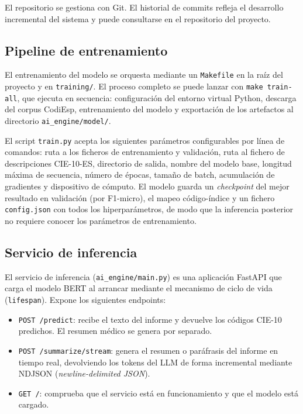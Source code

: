 El repositorio se gestiona con Git. El historial de commits refleja el desarrollo incremental del sistema y puede consultarse en el repositorio del proyecto.

\subsection{Pipeline de entrenamiento}

El entrenamiento del modelo se orquesta mediante un \texttt{Makefile} en la raíz del proyecto y en \texttt{training/}. El proceso completo se puede lanzar con \texttt{make train-all}, que ejecuta en secuencia: configuración del entorno virtual Python, descarga del corpus CodiEsp, entrenamiento del modelo y exportación de los artefactos al directorio \texttt{ai\_engine/model/}.

El script \texttt{train.py} acepta los siguientes parámetros configurables por línea de comandos: ruta a los ficheros de entrenamiento y validación, ruta al fichero de descripciones CIE-10-ES, directorio de salida, nombre del modelo base, longitud máxima de secuencia, número de épocas, tamaño de batch, acumulación de gradientes y dispositivo de cómputo. El modelo guarda un \emph{checkpoint} del mejor resultado en validación (por F1-micro), el mapeo código-índice y un fichero \texttt{config.json} con todos los hiperparámetros, de modo que la inferencia posterior no requiere conocer los parámetros de entrenamiento.

\subsection{Servicio de inferencia}

El servicio de inferencia (\texttt{ai\_engine/main.py}) es una aplicación FastAPI que carga el modelo BERT al arrancar mediante el mecanismo de ciclo de vida (\texttt{lifespan}). Expone los siguientes endpoints:

\begin{itemize}
 \item \texttt{POST /predict}: recibe el texto del informe y devuelve los códigos CIE-10 predichos. El resumen médico se genera por separado.
 \item \texttt{POST /summarize/stream}: genera el resumen o paráfrasis del informe en tiempo real, devolviendo los tokens del LLM de forma incremental mediante NDJSON (\emph{newline-delimited JSON}).
 \item \texttt{GET /}: comprueba que el servicio está en funcionamiento y que el modelo está cargado.
\end{itemize}

